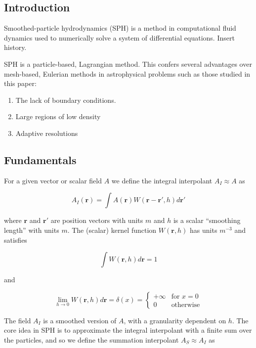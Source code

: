\documentclass[../main.tex]{subfiles}
\begin{document}
\subsection{Introduction}
Smoothed-particle hydrodynamics (SPH) is a method in computational fluid dynamics used to numerically solve a system of differential equations. Insert history.

SPH is a particle-based, Lagrangian method. This confers several advantages over mesh-based, Eulerian methods in astrophysical problems such as those studied in this paper:
\begin{enumerate}
    \item The lack of boundary conditions.
    \item Large regions of low density
    \item Adaptive resolutions
\end{enumerate}

\subsection{Fundamentals}
For a given vector or scalar field $A$ we define the integral interpolant $A_I \approx A$ as

\begin{equation}
    A_I(\bm{r}) = \int A(\bm{r}) W(\bm{r} - \bm{r'}, h) d\bm{r'}
\end{equation}

where $\bm{r}$ and $\bm{r'}$ are position vectors with units $m$ and $h$ is a scalar ``smoothing length'' with units $m$. The (scalar) kernel function $W(\bm{r}, h)$ has units $m^{-3}$ and satisfies

\begin{equation}
    \int W(\bm{r}, h) d\bm{r} = 1
\end{equation}

and

\begin{equation}
    \lim_{h\to0} W(\bm{r}, h) d\bm{r} = \delta(x) = \begin{cases}
        +\infty & \text{for } x = 0 \\
        0 & \text{otherwise} \end{cases}
\end{equation}

The field $A_I$ is a smoothed version of $A$, with a granularity dependent on $h$. The core idea in SPH is to approximate the integral interpolant with a finite sum over the particles, and so we define the summation interpolant $A_S \approx A_I$ as
\end{document}
